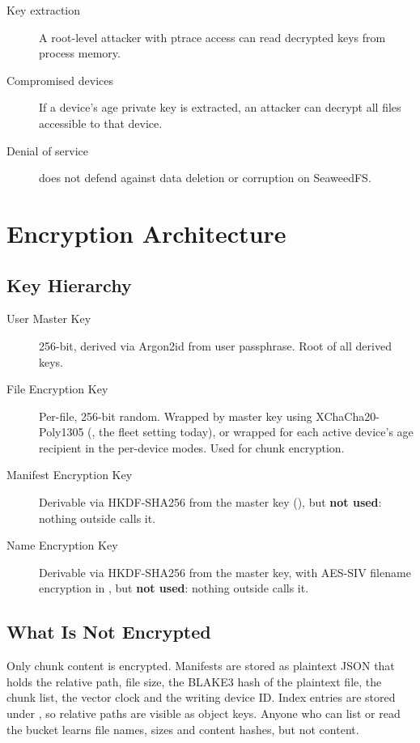 \documentclass[11pt,a4paper]{article}
\begin{document}
\begin{description}
  \item[Key extraction] A root-level attacker with ptrace access can read
    decrypted keys from process memory.
  \item[Compromised devices] If a device's age private key is extracted,
    an attacker can decrypt all files accessible to that device.
  \item[Denial of service] \tcfs{} does not defend against data deletion or
    corruption on SeaweedFS.
\end{description}

\section{Encryption Architecture}

\subsection{Key Hierarchy}

\begin{description}
  \item[User Master Key] 256-bit, derived via Argon2id from user passphrase.
    Root of all derived keys.
  \item[File Encryption Key] Per-file, 256-bit random. Wrapped by master key
    using XChaCha20-Poly1305 (, the fleet setting
    today), or wrapped for each active device's age recipient in the
    per-device modes. Used for chunk encryption.
  \item[Manifest Encryption Key] Derivable via HKDF-SHA256 from the master
    key (), but \textbf{not used}: nothing outside
     calls it.
  \item[Name Encryption Key] Derivable via HKDF-SHA256 from the master key,
    with AES-SIV filename encryption in , but
    \textbf{not used}: nothing outside  calls it.
\end{description}

\subsection{What Is Not Encrypted}

Only chunk content is encrypted. Manifests are stored as plaintext JSON that
holds the relative path, file size, the BLAKE3 hash of the plaintext file,
the chunk list, the vector clock and the writing device ID. Index entries are
stored under , so relative paths are
visible as object keys. Anyone who can list or read the bucket learns file
names, sizes and content hashes, but not content.
\end{document}
